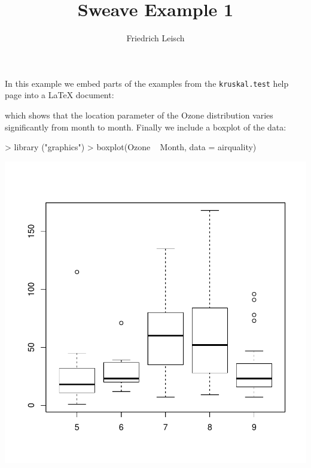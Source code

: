 \documentclass[a4paper]{article}
\title{Sweave Example 1}
\author{Friedrich Leisch}
\begin{document}

\maketitle
In this example we embed parts of the examples from the 
\texttt{kruskal.test} help page into a \LaTeX{} document:


which shows that the location parameter of the Ozone distribution varies significantly from month to month. Finally we include a boxplot of the data:
\begin{center}
\begin{Schunk}
\begin{Sinput}
> library ("graphics")
> boxplot(Ozone ~ Month, data = airquality) 
\end{Sinput}
\end{Schunk}
\includegraphics{exampl14-002}
\end{center}
\end{document}
